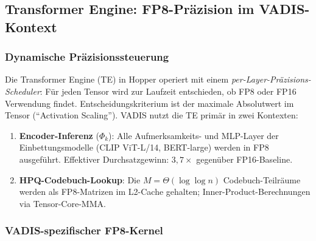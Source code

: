 ﻿\documentclass[12pt,a4paper]{article}
\begin{document}
\subsection{Transformer Engine: FP8-Präzision im VADIS-Kontext}
\label{sub:te}

\subsubsection{Dynamische Präzisionssteuerung}

Die Transformer Engine (TE) in Hopper operiert mit einem
\emph{per-Layer-Präzisions-Scheduler}: Für jeden Tensor wird
zur Laufzeit entschieden, ob FP8 oder FP16 Verwendung findet.
Entscheidungskriterium ist der maximale Absolutwert im Tensor
(``Activation Scaling''). VADIS nutzt die TE primär in
zwei Kontexten:

\begin{enumerate}[leftmargin=1.4em, itemsep=2pt]
  \item \textbf{Encoder-Inferenz} ($\Phi_k$): Alle Aufmerksamkeits-
        und MLP-Layer der Einbettungsmodelle (CLIP ViT-L/14,
        BERT-large) werden in FP8 ausgeführt.
        Effektiver Durchsatzgewinn: $3{,}7\times$ gegenüber FP16-Baseline.
  \item \textbf{HPQ-Codebuch-Lookup}: Die $M = \Theta(\log\log n)$
        Codebuch-Teilräume werden als FP8-Matrizen im L2-Cache
        gehalten; Inner-Product-Berechnungen via Tensor-Core-MMA.
\end{enumerate}

\subsubsection{VADIS-spezifischer FP8-Kernel}
\end{document}
